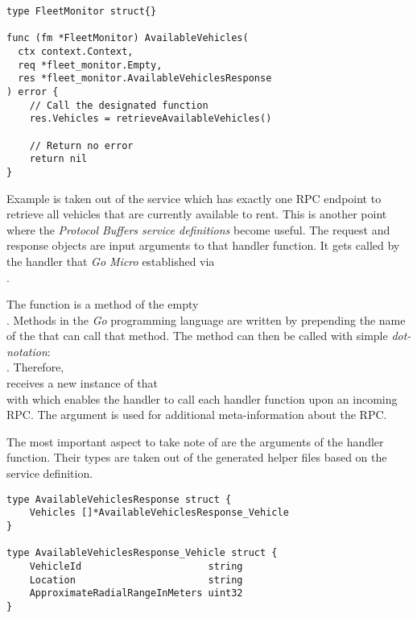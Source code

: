 \documentclass[12pt,a4paper,twoside]{report}
\begin{document}
\begin{lstlisting}[title=services/fleet-monitor/main.go, float, floatplacement=H]
type FleetMonitor struct{}

func (fm *FleetMonitor) AvailableVehicles(
  ctx context.Context,
  req *fleet_monitor.Empty,
  res *fleet_monitor.AvailableVehiclesResponse
) error {
    // Call the designated function
	res.Vehicles = retrieveAvailableVehicles()

    // Return no error
	return nil
}
\end{lstlisting}

Example  is taken out of the
 service which has exactly one RPC endpoint to retrieve
all vehicles that are currently available to rent.
This is another point where the \textit{Protocol Buffers service definitions}
become useful. The request and response objects are input arguments to that
handler function. It gets called by the handler that \textit{Go Micro} established via\\
.

The function  is a method of the empty\\
 . Methods in the \textit{Go} programming
language are written by prepending the name of the  that can
call that method. The method can then be called with simple \textit{dot-notation}:\\
.
Therefore, \\ receives a new instance of that\\
  with  which enables
the handler to call each handler function upon an incoming RPC.
The  argument is used for additional meta-information about the RPC.

The most important aspect to take note of are the arguments of the handler function.
Their types are taken out of the generated helper files based on the service definition.

\begin{lstlisting}[title=services/fleet-monitor/proto/fleet-monitor.pb.go, float, floatplacement=H]
type AvailableVehiclesResponse struct {
	Vehicles []*AvailableVehiclesResponse_Vehicle
}

type AvailableVehiclesResponse_Vehicle struct {
	VehicleId                      string
	Location                       string
	ApproximateRadialRangeInMeters uint32
}
\end{lstlisting}
\end{document}
